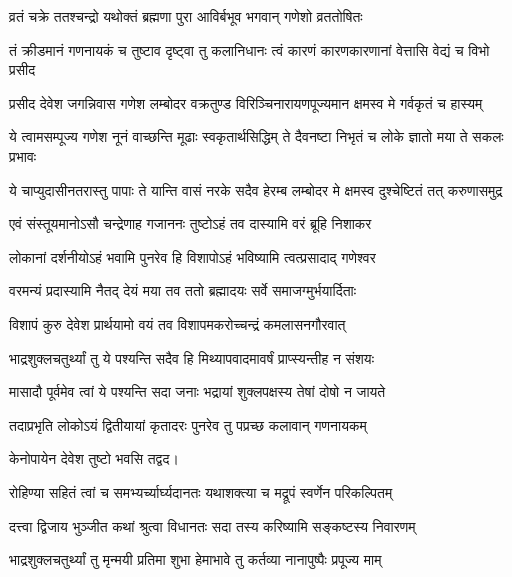 \twolineshloka
{व्रतं चक्रे ततश्चन्द्रो यथोक्तं ब्रह्मणा पुरा}
{आविर्बभूव भगवान् गणेशो व्रततोषितः}%

\fourlineindentedshloka
{तं क्रीडमानं गणनायकं च}
{तुष्टाव दृष्ट्वा तु कलानिधानः}
{त्वं कारणं कारणकारणानां}
{वेत्तासि वेद्यं च विभो प्रसीद}%

\fourlineindentedshloka
{प्रसीद देवेश जगन्निवास}
{गणेश लम्बोदर वक्रतुण्ड}
{विरिञ्चिनारायणपूज्यमान}
{क्षमस्व मे गर्वकृतं च हास्यम्}%

\fourlineindentedshloka
{ये त्वामसम्पूज्य गणेश नूनं}
{वाच्छन्ति मूढाः स्वकृतार्थसिद्धिम्}
{ते दैवनष्टा निभृतं च लोके}
{ज्ञातो मया ते सकलः प्रभावः}%

\fourlineindentedshloka
{ये चाप्युदासीनतरास्तु पापाः}
{ते यान्ति वासं नरके सदैव}
{हेरम्ब लम्बोदर मे क्षमस्व}
{दुश्चेष्टितं तत् करुणासमुद्र}%

\twolineshloka
{एवं संस्तूयमानोऽसौ चन्द्रेणाह गजाननः}
{तुष्टोऽहं तव दास्यामि वरं ब्रूहि निशाकर}%


\twolineshloka
{लोकानां दर्शनीयोऽहं भवामि पुनरेव हि}
{विशापोऽहं भविष्यामि त्वत्प्रसादाद् गणेश्वर}%


\twolineshloka
{वरमन्यं प्रदास्यामि नैतद् देयं मया तव}
{ततो ब्रह्मादयः सर्वे समाजग्मुर्भयार्दिताः}%

\twolineshloka
{विशापं कुरु देवेश प्रार्थयामो वयं तव}
{विशापमकरोच्चन्द्रं कमलासनगौरवात्}%

\twolineshloka
{भाद्रशुक्लचतुर्थ्यां तु ये पश्यन्ति सदैव हि}
{मिथ्यापवादमावर्षं प्राप्स्यन्तीह न संशयः}%

\twolineshloka
{मासादौ पूर्वमेव त्वां ये पश्यन्ति सदा जनाः}
{भद्रायां शुक्लपक्षस्य तेषां दोषो न जायते}%

\twolineshloka
{तदाप्रभृति लोकोऽयं द्वितीयायां कृतादरः}
{पुनरेव तु पप्रच्छ कलावान् गणनायकम्}%

{केनोपायेन देवेश तुष्टो भवसि तद्वद।}


\twolineshloka
{रोहिण्या सहितं त्वां च समभ्यर्च्यार्घ्यदानतः}
{यथाशक्त्या च मद्रूपं स्वर्णेन परिकल्पितम्}%

\twolineshloka
{दत्त्वा द्विजाय भुञ्जीत कथां श्रुत्वा विधानतः}
{सदा तस्य करिष्यामि सङ्कष्टस्य निवारणम्}%

\twolineshloka
{भाद्रशुक्लचतुर्थ्यां तु मृन्मयी प्रतिमा शुभा}
{हेमाभावे तु कर्तव्या नानापुष्पैः प्रपूज्य माम्}%

